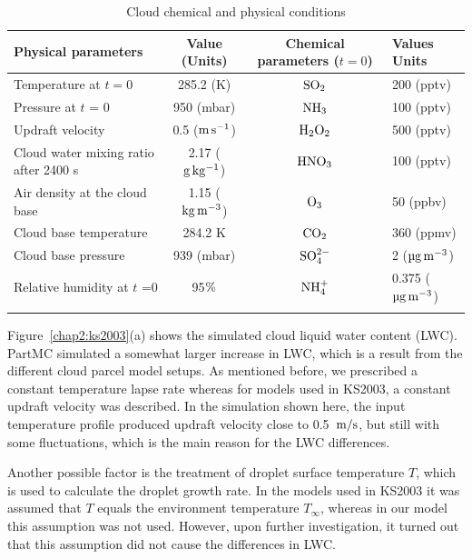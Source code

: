 \documentclass[edeposit,fullpage]{uiucthesis2009}
\makeatletter
\DeclareRobustCommand*\unit[1]
 {\ensuremath{%
   {\thinmuskip3mu\relax
    \def\mu{\text{\textmu}}\def~{\,}%
    \ifx\f@series\testbx\mathbf{#1}\else\mathrm{#1}\fi}}}
\makeatother
\begin{document}
\begin{table}[ht]
\centering
\begin{threeparttable}
\caption{Cloud  chemical and physical conditions}
 \begin{tabular}{l c|c l}
 \hline
  Physical parameters & Value (Units) & Chemical parameters ($t = 0$) & Values Units\\
 \hline
 Temperature at $t =0$ & 285.2 (K)&$\rm SO_2$ & 200 (pptv)\\
 Pressure at $t$ = 0 & 950 (mbar)&$\rm NH_3$ & 100 (pptv)\\
 Updraft velocity & 0.5 ($\rm m\,s^{-1}$)&$\rm H_2O_2$ & 500 (pptv)\\
 Cloud water mixing ratio after 2400 s& 2.17 ($\rm g\,kg^{-1}$)&$\rm HNO_3$  & 100 (pptv)\\
 Air density at the cloud base & 1.15 ($\rm kg\,m^{-3}$) & $\rm O_3$ &50 (ppbv)\\
 Cloud base temperature& 284.2 K&$\rm CO_2$ & 360 (ppmv)\\
 Cloud base pressure& 939 (mbar)& $\rm SO_4^{2-}$ & 2 ($\rm \mu g \, m^{-3}$)\\ 
 Relative humidity at $t$ =0 & 95$\rm \%$ & $\rm NH_4^+$ & 0.375 ($\rm \mu g\, m^{-3}$)\\
 \hline
 \label{setting}
\end{tabular}
\end{threeparttable}
\end{table}

Figure~\ref{chap2:ks2003}(a) shows the simulated cloud liquid water
content (LWC). PartMC simulated a somewhat larger increase in LWC,
which is a result from the different cloud parcel model setups. As
mentioned before, we prescribed a constant temperature lapse rate
whereas for models used in KS2003, a constant updraft velocity was
described. In the simulation shown here, the input temperature profile
produced updraft velocity close to 0.5~\unit{m/s}, but still with some
fluctuations, which is the main reason for the LWC differences.

Another possible factor is the treatment of droplet surface
temperature $T$, which is used to calculate the droplet growth
rate. In the models used in KS2003 it was assumed that $T$ equals the
environment temperature $T_\infty$, whereas in our model this
assumption was not used. However, upon further investigation, it
turned out that this assumption did not cause the differences in LWC.
\end{document}
